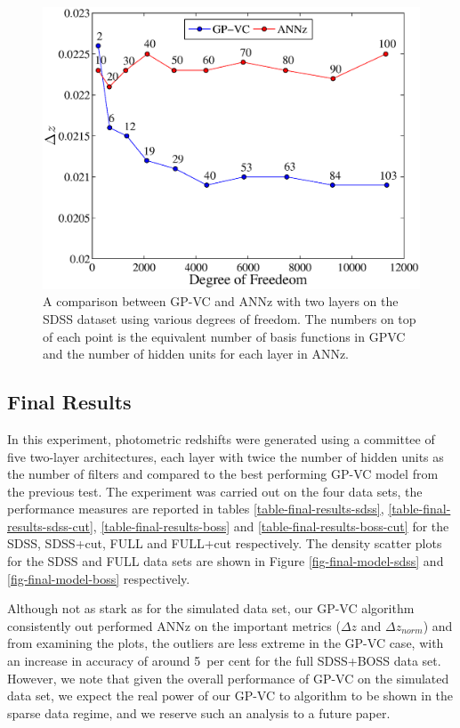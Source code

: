 \documentclass[useAMS,usenatbib,fleqn]{mn2e}
\begin{document}
\begin{figure}
	\centering
	\includegraphics[width=\columnwidth]{figures/sdss_final.eps}
	\caption{A comparison between GP-VC and {\sc ANNz} with two layers on the SDSS dataset using various degrees of freedom. The numbers on top of each point is the equivalent number of basis functions in GPVC and the number of hidden units for each layer in {\sc ANNz}.}
	\label{fig-ann-gpvc-sdss}
\end{figure}

\subsection{Final Results}

In this experiment, photometric redshifts were generated using a committee of five two-layer architectures, each layer with twice the number of hidden units as the number of filters and compared to the best performing GP-VC model from the previous test. The experiment was carried out on the four data sets, the performance measures are reported in tables \ref{table-final-results-sdss}, \ref{table-final-results-sdss-cut}, \ref{table-final-results-boss} and \ref{table-final-results-boss-cut} for the SDSS, SDSS+cut, FULL and FULL+cut respectively. The density scatter plots for the SDSS and FULL data sets are shown in Figure \ref{fig-final-model-sdss} and \ref{fig-final-model-boss} respectively. 

Although not as stark as for the simulated data set, our GP-VC algorithm consistently out performed {\sc ANNz} on the important metrics ($\Delta z$ and $\Delta z_{norm}$) and from examining the plots, the outliers are less extreme in the GP-VC case, with an increase in accuracy of around 5~per cent for the full SDSS+BOSS data set. However, we note that given the overall performance of GP-VC on the simulated data set, we expect the real power of our GP-VC to algorithm to be shown in the sparse data regime, and we reserve such an analysis to a future paper.
\end{document}
